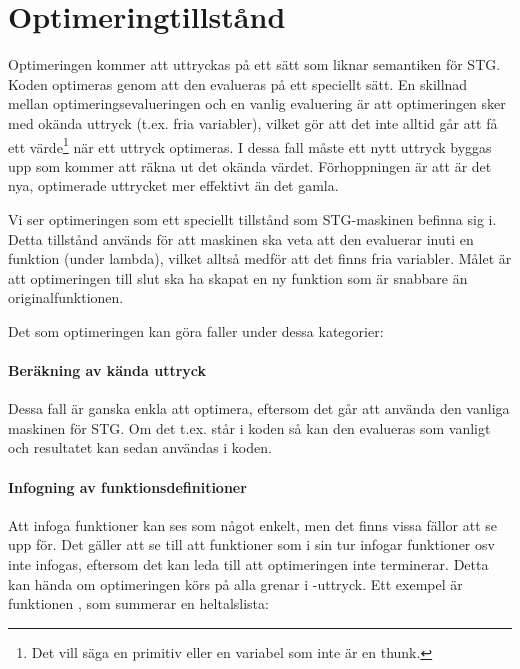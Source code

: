 \documentclass[Rapport]{subfiles}
\begin{document}
\section{Optimeringtillstånd}


Optimeringen kommer att uttryckas på ett sätt som liknar semantiken för STG. Koden optimeras
 genom att den evalueras på ett speciellt sätt. En skillnad mellan optimeringsevalueringen och en vanlig
evaluering är att optimeringen sker med okända uttryck (t.ex. fria variabler), 
vilket gör att det inte alltid går att få ett värde\footnote{ Det vill säga en primitiv eller en variabel som inte
är en thunk.}  när ett uttryck optimeras. I dessa
fall måste ett nytt uttryck byggas upp som kommer att räkna ut det okända värdet. 
Förhoppningen är att är det nya, optimerade uttrycket mer effektivt än det gamla.

Vi ser optimeringen som ett speciellt tillstånd som STG-maskinen befinna sig i. 
Detta tillstånd används för att maskinen ska veta att den evaluerar inuti en funktion
(under lambda), vilket alltså medför att det finns fria variabler. 
Målet är att optimeringen till slut ska ha skapat en ny funktion som är snabbare 
än originalfunktionen.

Det som optimeringen kan göra faller under dessa kategorier:

\paragraph{ Beräkning av kända uttryck }
Dessa fall är ganska enkla att optimera, eftersom det går att använda den vanliga
maskinen för STG. Om det t.ex. står  i koden så kan den evalueras
som vanligt och resultatet  kan sedan användas i koden.

\paragraph{ Infogning av funktionsdefinitioner }

Att infoga funktioner kan ses som något enkelt, men det finns vissa fällor att se upp
för. Det gäller att se till att funktioner som i sin tur infogar funktioner osv inte infogas,
eftersom det kan leda till att optimeringen inte terminerar. Detta kan hända om optimeringen körs på alla grenar
i -uttryck. Ett exempel är funktionen , som summerar en heltalslista:
\end{document}
